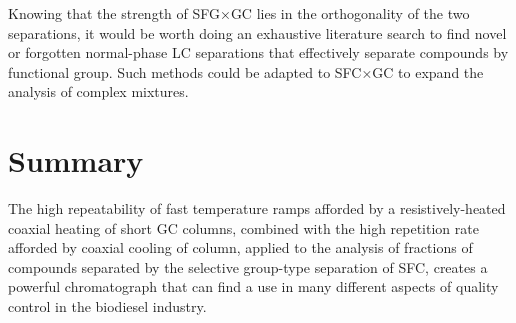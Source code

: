 Knowing that the strength of SFG×GC lies in the orthogonality of the two
separations, it would be worth doing an exhaustive literature search to find
novel or forgotten normal-phase LC separations that effectively separate
compounds by functional group. Such methods could be adapted to SFC×GC to expand
the analysis of complex mixtures.

\section{Summary}

The high repeatability of fast temperature ramps afforded by a
resistively-heated coaxial heating of short GC columns, combined with the high
repetition rate afforded by coaxial cooling of column, applied to the analysis
of fractions of compounds separated by the selective group-type separation of
SFC, creates a powerful chromatograph that can find a use in many different
aspects of quality control in the biodiesel industry.

